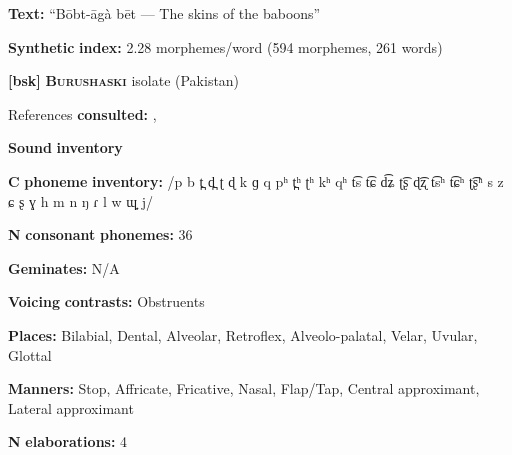 \begin{styleBody}
\textbf{Text:} “Bōbt-āgà bēt — The skins of the baboons” \citep[594-599]{Rapold2006}
\end{styleBody}

\begin{styleBody}
\textbf{Synthetic} \textbf{index:} 2.28 morphemes/word (594 morphemes, 261 words)
\end{styleBody}

\begin{styleBody}
\textbf{[bsk]}   \textbf{\textsc{Burushaski}}  isolate (Pakistan)
\end{styleBody}

\begin{styleBody}
References \textbf{consulted:} \citet{Anderson1997}, \citet{Yoshioka2012}
\end{styleBody}

\begin{styleBody}
\textbf{Sound} \textbf{inventory}
\end{styleBody}

\begin{styleBody}
\textbf{C} \textbf{phoneme} \textbf{inventory:} /p b t̪ d̪ ʈ ɖ k ɡ q pʰ t̪ʰ ʈʰ kʰ qʰ t͡s t͡ɕ d͡ʑ ʈ͡ʂ ɖ͡ʐ t͡sʰ t͡ɕʰ ʈ͡ʂʰ s z ɕ ʂ ɣ h m n ŋ ɾ l w ɰ̟ j/
\end{styleBody}

\begin{styleBody}
\textbf{N} \textbf{consonant} \textbf{phonemes:} 36
\end{styleBody}

\begin{styleBody}
\textbf{Geminates:} N/A
\end{styleBody}

\begin{styleBody}
\textbf{Voicing} \textbf{contrasts:} Obstruents
\end{styleBody}

\begin{styleBody}
\textbf{Places:} Bilabial, Dental, Alveolar, Retroflex, Alveolo-palatal, Velar, Uvular, Glottal
\end{styleBody}

\begin{styleBody}
\textbf{Manners:} Stop, Affricate, Fricative, Nasal, Flap/Tap, Central approximant, Lateral approximant
\end{styleBody}

\begin{styleBody}
\textbf{N} \textbf{elaborations:} 4
\end{styleBody}

